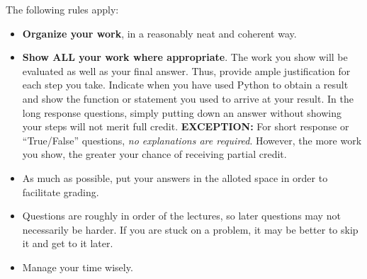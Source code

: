 \documentclass[12pt,twoside]{article}
\newcommand{\?}{\stackrel{?}{=}}
\begin{document}
\noindent The following rules apply: 
\begin{itemize}


\item \textbf{Organize your work}, in a reasonably neat and coherent way.%

\item \textbf{Show ALL your work where appropriate}.
  The work you show will be evaluated as well as your final answer.
  Thus, provide ample justification for each step you take.
  Indicate when you have used Python to obtain a result and show the function or statement you used to arrive at your result.
  In the long response questions, simply putting down an answer without showing your steps  will not merit full credit.
  {\bf EXCEPTION:} For short response or ``True/False'' questions, \textit{no explanations are required}.
  However, the more work you show, the greater your chance of receiving partial credit.

\item As much as possible, put your answers in the alloted space in order to facilitate grading.

\item Questions are roughly in order of the lectures, so later questions may not necessarily be harder.
  If you are stuck on a problem, it may be better to skip it and get to it later.

\item Manage your time wisely.%

\end{itemize}

\newpage %
\end{document}
